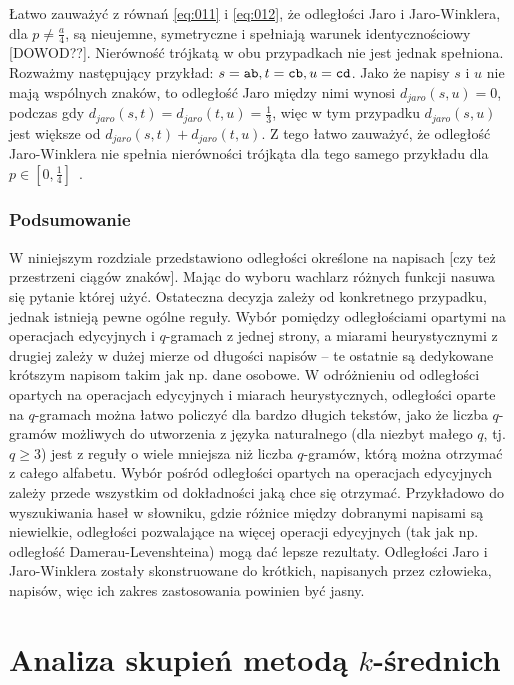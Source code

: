 \documentclass{praca1}
\begin{document}
Łatwo zauważyć z równań \ref{eq:011} i \ref{eq:012}, że odległości Jaro i Jaro-Winklera, dla $p \neq \frac{a}{4}$, są nieujemne,  symetryczne i spełniają warunek identycznościowy [DOWOD??]. Nierówność trójkatą w obu przypadkach nie jest jednak spełniona. Rozważmy następujący przykład: $s = \verb|ab|, t = \verb|cb|, u = \verb|cd|$. Jako że napisy $s$ i $u$ nie mają wspólnych znaków, to odległość Jaro między nimi wynosi $d_{jaro}(s, u) = 0$, podczas gdy $d_{jaro}(s, t) = d_{jaro}(t, u) = \frac{1}{3}$, więc w tym przypadku $d_{jaro}(s, u)$ jest większe od $d_{jaro}(s, t) + d_{jaro}(t, u)$. Z tego łatwo zauważyć, że odległość Jaro-Winklera nie spełnia nierówności trójkąta  dla tego samego przykładu dla $p \in [0, \frac{1}{4}]$~\cite{Loo2014:stringdist}.

\subsection{Podsumowanie}

W niniejszym rozdziale przedstawiono odległości określone na napisach [czy też przestrzeni ciągów znaków]. Mając do wyboru wachlarz różnych funkcji nasuwa się pytanie której użyć. Ostateczna decyzja zależy od konkretnego przypadku, jednak istnieją pewne ogólne reguły. Wybór pomiędzy odległościami opartymi na operacjach edycyjnych i $q$-gramach z jednej strony, a miarami heurystycznymi z drugiej zależy w dużej mierze od długości napisów -- te ostatnie są dedykowane krótszym napisom takim jak np. dane osobowe. W odróżnieniu od odległości opartych na operacjach edycyjnych i miarach heurystycznych, odległości oparte na $q$-gramach można łatwo policzyć dla bardzo długich tekstów, jako że liczba $q$-gramów możliwych do utworzenia z języka naturalnego (dla niezbyt małego $q$, tj. $q \geq 3$) jest z reguły o wiele mniejsza niż liczba $q$-gramów, którą można otrzymać z całego alfabetu. Wybór pośród odległości opartych na operacjach edycyjnych zależy przede wszystkim od dokładności jaką chce się otrzymać. Przykładowo do wyszukiwania haseł w słowniku, gdzie różnice między dobranymi napisami są niewielkie, odległości pozwalające na więcej operacji edycyjnych (tak jak np. odległość Damerau-Levenshteina) mogą dać lepsze rezultaty. Odległości Jaro i Jaro-Winklera zostały skonstruowane do krótkich, napisanych przez człowieka, napisów, więc ich zakres zastosowania powinien być jasny.


\chapter{Analiza skupień metodą $k$-średnich}
\end{document}
